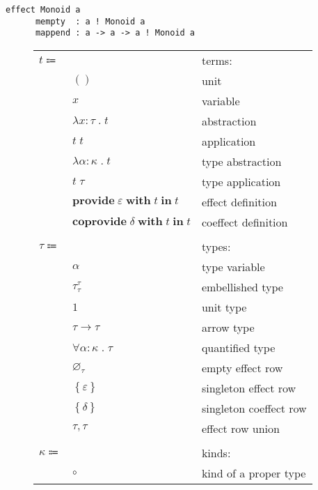 \documentclass[12pt]{article}
\newcommand\anno[2]{#1 : #2}
\newcommand\term{t}
\newcommand\eunit{()}
\newcommand\evar{x}
\newcommand\eabs[2]{\lambda #1 \; . \; #2}
\newcommand\eapp[2]{#1 \; #2}
\newcommand\etabs[2]{\lambda #1 \; . \; #2}
\newcommand\etapp[2]{#1 \; #2}
\newcommand\eprovide[3]{\textbf{provide} \; #1 \; \textbf{with} \; #2 \; \textbf{in} \; #3}
\newcommand\ecoprovide[3]{\textbf{coprovide} \; #1 \; \textbf{with} \; #2 \; \textbf{in} \; #3}
\newcommand\type{\tau}
\newcommand\tvar{\alpha}
\newcommand\tembellished[3]{{#1}^{#2}_{#3}}
\newcommand\tunit{1}
\newcommand\tarrow[2]{#1 \rightarrow #2}
\newcommand\tforall[2]{\forall #1 \; . \; #2}
\newcommand\tempty{\varnothing_{\type}}
\newcommand\tsingleton[1]{\left\{ #1 \right\}}
\newcommand\tunion[2]{#1, #2}
\newcommand\kind{\kappa}
\newcommand\kproper{\circ}
\newcommand\effect{\varepsilon}
\newcommand\coeffect{\delta}
\begin{document}
  \begin{lstlisting}[gobble=4]
    effect Monoid a
      mempty  : a ! Monoid a
      mappend : a -> a -> a ! Monoid a
  \end{lstlisting}

  \begin{figure}
    \begin{mdframed}[backgroundcolor=none]
      \begin{center}
        \begin{tabular}{l l l}
          $\term \Coloneqq $ & & terms: \\
          & $\eunit$ & unit \\
          & $\evar$ & variable \\
          & $\eabs{\anno{\evar}{\type}}{\term}$ & abstraction \\
          & $\eapp{\term}{\term}$ & application \\
          & $\etabs{\anno{\tvar}{\kind}}{\term}$ & type abstraction \\
          & $\etapp{\term}{\type}$ & type application \\
          & $\eprovide{\effect}{\term}{\term}$ & effect definition \\
          & $\ecoprovide{\coeffect}{\term}{\term}$ & coeffect definition \\
          \\
          $\type \Coloneqq$ & & types: \\
          & $\tvar$ & type variable \\
          & $\tembellished{\type}{\type}{\type}$ & embellished type \\
          & $\tunit$ & unit type \\
          & $\tarrow{\type}{\type}$ & arrow type \\
          & $\tforall{\anno{\tvar}{\kind}}{\type}$ & quantified type \\
          & $\tempty$ & empty effect row \\
          & $\tsingleton{\effect}$ & singleton effect row \\
          & $\tsingleton{\coeffect}$ & singleton coeffect row \\
          & $\tunion{\type}{\type}$ & effect row union \\
          \\
          $\kind \Coloneqq$ & & kinds: \\
          & $\kproper$ & kind of a proper type \\

\end{tabular}
\end{center}
\end{mdframed}
\end{figure}
\end{document}
